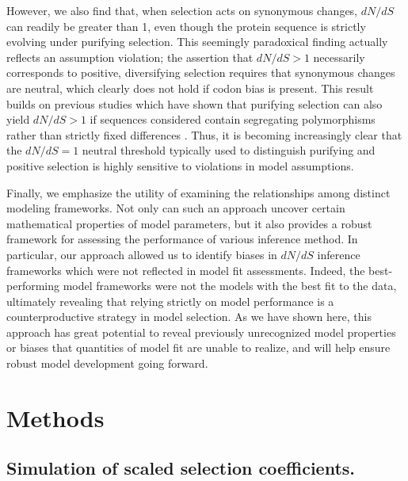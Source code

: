 \documentclass[11pt]{article}
\begin{document}
However, we also find that, when selection acts on synonymous changes, $dN/dS$ can readily be greater than 1, even though the protein sequence is strictly evolving under purifying selection. This seemingly paradoxical finding actually reflects an assumption violation; the assertion that $dN/dS > 1$ necessarily corresponds to positive, diversifying selection requires that synonymous changes are neutral, which clearly does not hold if codon bias is present. This result builds on previous studies which have shown that purifying selection can also yield $dN/dS > 1$ if sequences considered contain segregating polymorphisms rather than strictly fixed differences \cite{Rochaetal2006,KryazhimskiyPlotkin2008,Mugaletal2014}. Thus, it is becoming increasingly clear that the $dN/dS = 1$ neutral threshold typically used to distinguish purifying and positive selection is highly sensitive to violations in model assumptions. 


Finally, we emphasize the utility of examining the relationships among distinct modeling frameworks. Not only can such an approach uncover certain mathematical properties of model parameters, but it also provides a robust framework for assessing the performance of various inference method. In particular, our approach allowed us to identify biases in $dN/dS$ inference frameworks which were not reflected in model fit assessments. Indeed, the best-performing model frameworks were not the models with the best fit to the data, ultimately revealing that relying strictly on model performance is a counterproductive strategy in model selection. As we have shown here, this approach has great potential to reveal previously unrecognized model properties or biases that quantities of model fit are unable to realize, and will help ensure robust model development going forward.


		
\section*{Methods}

\subsection*{Simulation of scaled selection coefficients.}
\end{document}

